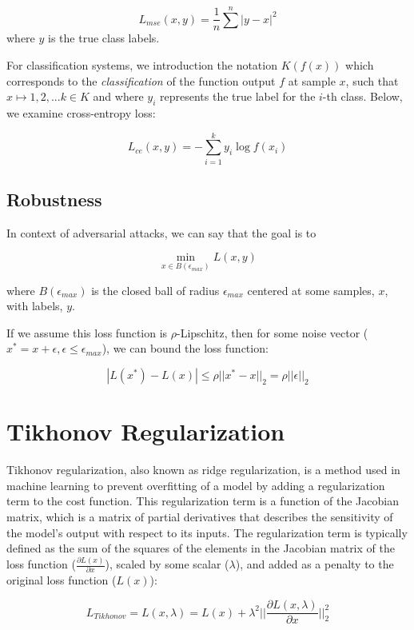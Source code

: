 \documentclass[conference]{IEEEtran}
\begin{document}
$$ 
L_{mse}(x, y) = \frac{1}{n}\sum^n | y  - x|^2
$$
where $y$ is the true class labels.

For classification systems, we introduction the notation $K(f(x))$ which corresponds to the \textit{classification} of the function output $f$ at sample $x$, such that $x \mapsto 1, 2, ...k \in K$ and where $y_i$ represents the true label for the $i$-th class. Below, we examine cross-entropy loss:

$$
L_{ce}(x, y) = -\sum_{i=1}^k y_i \log{f(x_i)}
$$

\subsection{Robustness}
In context of adversarial attacks, we can say that the goal is to 

\begin{equation}
\min_{x \in B(\epsilon_{max})} L(x, y)
\label{eq:robustness}
\end{equation}

where $B(\epsilon_{max})$ is the closed ball of radius $\epsilon_{max}$ centered at some samples, $x$, with labels, $y$.

If we assume this loss function is $\rho$-Lipschitz, then for some noise vector ($x^* = x + \epsilon, \epsilon \leq \epsilon_{max}$), we can bound the loss function:

\begin{equation}
| L(x^*) - L(x) | \leq \rho || x^* - x ||_2 = \rho ||\epsilon||_2
\label{eq:tikho_lip}
\end{equation}


\section{Tikhonov Regularization}
Tikhonov regularization, also known as ridge regularization, is a method used in machine learning to prevent overfitting of a model by adding a regularization term to the cost function. This regularization term is a function of the Jacobian matrix, which is a matrix of partial derivatives that describes the sensitivity of the model's output with respect to its inputs. The regularization term is typically defined as the sum of the squares of the elements in the Jacobian matrix of the loss function ($\frac{\partial L(x)}{ \partial x}$), scaled by some scalar ($\lambda$), and added as a penalty to the original loss function ($L(x)$):

\begin{equation}
L_{Tikhonov} = L(x, \lambda) = L(x) + \lambda^2 || \frac{\partial L(x, \lambda)}{ \partial x} ||_2^2
\label{eq:tikho_loss}
\end{equation}
\end{document}
